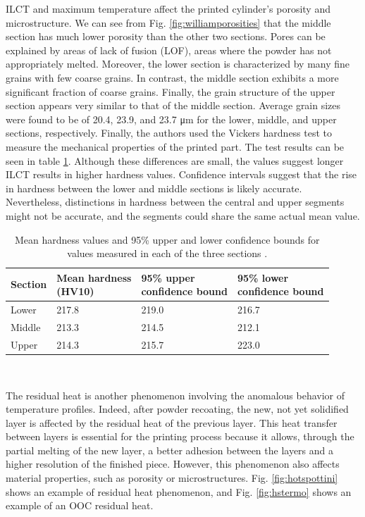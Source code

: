 ILCT and maximum temperature affect the printed cylinder's porosity and microstructure. We can see from Fig. \ref{fig:williamporosities} that the middle section has much lower porosity than the other two sections. Pores can be explained by areas of lack of fusion (LOF), areas where the powder has not appropriately melted. Moreover, the lower section is characterized by many fine grains with few coarse grains. In contrast, the middle section exhibits a more significant fraction of coarse grains. Finally, the grain structure of the upper section appears very similar to that of the middle section. Average grain sizes were found to be of \num{20.4}, \num{23.9}, and \num{23.7} \unit{\micro\metre} for the lower, middle, and upper sections, respectively. Finally, the authors used the Vickers hardness test to measure the mechanical properties of the printed part. The test results can be seen in table \ref{table:hard}. Although these differences are small, the values suggest longer ILCT results in higher hardness values. Confidence intervals suggest that the rise in hardness between the lower and middle sections is likely accurate. Nevertheless, distinctions in hardness between the central and upper segments might not be accurate, and the segments could share the same actual mean value.
\begin{table}
\footnotesize
    \centering 
    \begin{tabular}{|l l l l|}
    \hline
    Section & \makecell{Mean hardness \\(HV10)} & \makecell{95\% upper \\confidence bound} & \makecell{95\% lower \\ confidence bound} \T\B \\
    \hline \hline
    Lower & 217.8 & 219.0 & 216.7  \T\B \\ 
    Middle & 213.3 & 214.5 & 212.1  \T\B \\ 
    Upper & 214.3 & 215.7 & 223.0  \T\B \\ 
    
    \hline
    \end{tabular}
    \\[10pt]
    \caption{Mean hardness values and 95\% upper and lower confidence bounds for values measured in each of the three sections \cite{williams_situ_2019}.}
    \label{table:hard}
\end{table}
The residual heat is another phenomenon involving the anomalous behavior of temperature profiles. Indeed, after powder recoating, the new, not yet solidified layer is affected by the residual heat of the previous layer. This heat transfer between layers is essential for the printing process because it allows, through the partial melting of the new layer, a better adhesion between the layers and a higher resolution of the finished piece. However, this phenomenon also affects material properties, such as porosity or microstructures. Fig. \ref{fig:hotspottini} shows an example of residual heat phenomenon, and Fig. \ref{fig:hstermo} shows an example of an OOC residual heat.
